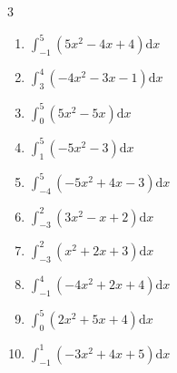 \begin{multicols}{3}
\begin{enumerate}
        \phantom{$\displaystyle =-17$}

\columnbreak %

  \item $\displaystyle \int_{-1}^{5}\left( 5x^{2}-4x+4 \right) \mathrm{d}x$

        \phantom{$\displaystyle =166$}

  \item $\displaystyle \int_{3}^{4}\left( -4x^{2}-3x-1 \right) \mathrm{d}x$

        \phantom{$\displaystyle =-60$}

  \item $\displaystyle \int_{0}^{5}\left( 5x^{2}-5x \right) \mathrm{d}x$


  \item $\displaystyle \int_{1}^{5}\left( -5x^{2}-3 \right) \mathrm{d}x$


  \item $\displaystyle \int_{-4}^{5}\left( -5x^{2}+4x-3 \right) \mathrm{d}x$


\columnbreak %

\resetques

  \item $\displaystyle \int_{-3}^{2}\left( 3x^{2}-x+2 \right) \mathrm{d}x$


  \item $\displaystyle \int_{-3}^{2}\left( x^{2}+2x+3 \right) \mathrm{d}x$


  \item $\displaystyle \int_{-1}^{4}\left( -4x^{2}+2x+4 \right) \mathrm{d}x$


  \item $\displaystyle \int_{0}^{5}\left( 2x^{2}+5x+4 \right) \mathrm{d}x$


  \item $\displaystyle \int_{-1}^{1}\left( -3x^{2}+4x+5 \right) \mathrm{d}x$


\end{enumerate}
\end{multicols}
